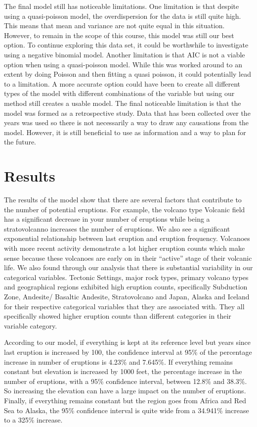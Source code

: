 \documentclass[
  12pt,
]{article}
\begin{document}
The final model still has noticeable limitations. One limitation is that
despite using a quasi-poisson model, the overdispersion for the data is
still quite high. This means that mean and variance are not quite equal
in this situation. However, to remain in the scope of this course, this
model was still our best option. To continue exploring this data set, it
could be worthwhile to investigate using a negative binomial model.
Another limitation is that AIC is not a viable option when using a
quasi-poisson model. While this was worked around to an extent by doing
Poisson and then fitting a quasi poisson, it could potentially lead to a
limitation. A more accurate option could have been to create all
different types of the model with different combinations of the variable
but using our method still creates a usable model. The final noticeable
limitation is that the model was formed as a retrospective study. Data
that has been collected over the years was used so there is not
necessarily a way to draw any causations from the model. However, it is
still beneficial to use as information and a way to plan for the future.

\section{Results}\label{results}

The results of the model show that there are several factors that
contribute to the number of potential eruptions. For example, the
volcano type Volcanic field has a significant decrease in your number of
eruptions while being a stratovolcanno increases the number of
eruptions. We also see a significant exponential relationship between
last eruption and eruption frequency. Volcanoes with more recent
activity demonstrate a lot higher eruption counts which make sense
because these volcanoes are early on in their ``active'' stage of their
volcanic life. We also found through our analysis that there is
substantial variability in our categorical variables. Tectonic Settings,
major rock types, primary volcano types and geographical regions
exhibited high eruption counts, specifically Subduction Zone, Andesite/
Basaltic Andesite, Stratovolcano and Japan, Alaska and Iceland for their
respective categorical variables that they are associated with. They all
specifically showed higher eruption counts than different categories in
their variable category.

According to our model, if everything is kept at its reference level but
years since last eruption is increased by 100, the confidence interval
at 95\% of the percentage increase in number of eruptions is 4.23\% and
7.645\%. If everything remains constant but elevation is increased by
1000 feet, the percentage increase in the number of eruptions, with a
95\% confidence interval, between 12.8\% and 38.3\%. So increasing the
elevation can have a large impact on the number of eruptions. Finally,
if everything remains constant but the region goes from Africa and Red
Sea to Alaska, the 95\% confidence interval is quite wide from a
34.941\% increase to a 325\% increase.
\end{document}
